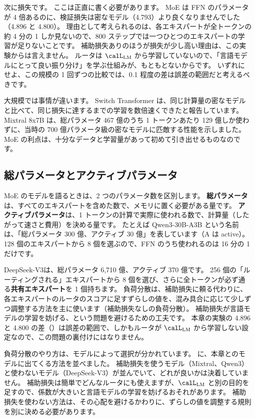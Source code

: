 次に損失です。
ここは正直に書く必要があります。
MoE は FFN のパラメータが 4 倍あるのに、検証損失は密なモデル（4.793）より良くなりませんでした（4.896 と 4.800）。
理由として考えられるのは、各エキスパートが全トークンの約 4 分の 1 しか見ないので、800 ステップでは一つひとつのエキスパートの学習が足りないことです。
補助損失ありのほうが損失が少し高い理由は、この実験からは言えません。
ルータは $\calL_{\mathrm{LM}}$ から学習していないので、「言語モデルにとって良い振り分け」を学ぶ仕組みが、もともとないからです。
いずれにせよ、この規模の 1 回ずつの比較では、0.1 程度の差は誤差の範囲だと考えるべきです。

大規模では事情が違います。
Switch Transformer は、同じ計算量の密なモデルと比べて、同じ損失に達するまでの学習を数倍速くできたと報告しています\cite{fedus2022switch}。
Mixtral 8x7B は、総パラメータ 467 億のうち 1 トークンあたり 129 億しか使わずに、当時の 700 億パラメータ級の密なモデルに匹敵する性能を示しました\cite{jiang2024mixtral}。
MoE の利点は、十分なデータと学習量があって初めて引き出せるものなのです。

\subsection*{総パラメータとアクティブパラメータ}

MoE のモデルを語るときは、2 つのパラメータ数を区別します。
\textbf{総パラメータ}は、すべてのエキスパートを含めた数で、メモリに置く必要がある量です。
\textbf{アクティブパラメータ}は、1 トークンの計算で実際に使われる数で、計算量（したがって速さと費用）を決める量です。
たとえば Qwen3-30B-A3B という名前は、「総パラメータ 300 億、アクティブ 30 億」を表しています（A は active）。
128 個のエキスパートから 8 個を選ぶので、FFN のうち使われるのは 16 分の 1 だけです\cite{yang2025qwen3}。

DeepSeek-V3\cite{liu2024deepseekv3}は、総パラメータ 6,710 億、アクティブ 370 億です。
256 個の「ルーティングされる」エキスパートから 8 個を選び、さらに全トークンが必ず通る\textbf{共有エキスパート}を 1 個持ちます。
負荷分散は、補助損失に頼る代わりに、各エキスパートのルータのスコアに足すずらしの値を、混み具合に応じて少しずつ調整する方法を主に使います（補助損失なしの負荷分散）。
補助損失が言語モデルの学習を妨げる、という問題を避けるための工夫です。
本章の実験の 4.896 と 4.800 の差（）は誤差の範囲で、しかもルータが $\calL_{\mathrm{LM}}$ から学習しない設定なので、この問題の裏付けにはなりません。

負荷分散のやり方は、モデルによって選択が分かれています。
に、本章とのモデルに出てくる方法を並べました。
補助損失を使うモデル（Mixtral、Qwen3）と使わないモデル（DeepSeek-V3）が並んでいて、どれが良いかは決着していません。
補助損失は簡単でどんなルータにも使えますが、$\calL_{\mathrm{LM}}$ と別の目的を足すので、係数が大きいと言語モデルの学習を妨げるおそれがあります。
補助損失を使わない方法は、その心配を避けるかわりに、ずらしの値を調整する規則を別に決める必要があります。

